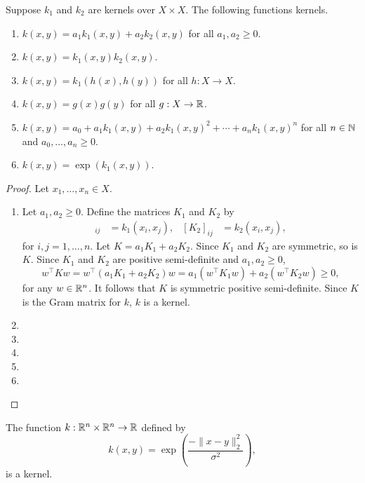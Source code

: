 \begin{theorem}
    \cite{rudin2023notes,shawe2004kernel}
    Suppose \(k_1\) and \(k_2\) are kernels over \(X \times X\).
    The following functions kernels.
    \begin{enumerate}
        \item \(k(x,y) = a_1 k_1(x,y) + a_2 k_2(x,y)\) for all \(a_1, a_2 \geq 0\).
        \item \(k(x,y) = k_1(x,y) k_2(x,y)\).
        \item \(k(x,y) = k_1(h(x),h(y))\) for all \(h : X \to X\).
        \item \(k(x,y) = g(x)g(y)\) for all \(g : X \to \mathbb{R}\).
        \item \(k(x,y) = a_0 + a_1 k_1(x,y) + a_2 k_1(x,y)^2 + \cdots + a_n k_1(x,y)^n\) for all \(n \in \mathbb{N}\) and \(a_0, \dots, a_n \geq 0\).
        \item \(k(x,y) = \exp(k_1(x,y))\).
    \end{enumerate}
\end{theorem}

\begin{proof}
    Let \(x_1, \dots, x_n \in X\).
    \begin{enumerate}
        \item Let \(a_1, a_2 \geq 0\).
        Define the matrices \(K_1\) and \(K_2\) by
        \begin{align*}
            [K_1]_{ij} &= k_1(x_i,x_j),&
            [K_2]_{ij} &= k_2(x_i,x_j),
        \end{align*}
        for \(i,j = 1,\dots,n\).
        Let \(K = a_1 K_1 + a_2 K_2\).
        Since \(K_1\) and \(K_2\) are symmetric, so is \(K\).
        Since \(K_1\) and \(K_2\) are positive semi-definite and \(a_1, a_2 \geq 0\),
        \[w^\top K w = w^\top (a_1 K_1 + a_2 K_2) w = a_1 (w^\top K_1 w) + a_2 (w^\top K_2 w) \geq 0,\]
        for any \(w \in \mathbb{R}^n\).
        It follows that \(K\) is symmetric positive semi-definite.
        Since \(K\) is the Gram matrix for \(k\), \(k\) is a kernel.
        \item 
        \item 
        \item 
        \item 
        \item 
    \end{enumerate}
\end{proof}

\begin{theorem}
    The function \(k : \mathbb{R}^n \times \mathbb{R}^n \to \mathbb{R}\) defined by
    \[k(x,y) = \exp\left(\dfrac{-\|x-y\|^2_2}{\sigma^2}\right),\]
    is a kernel.
\end{theorem}